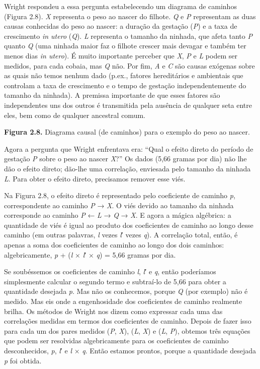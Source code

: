 \documentclass[11pt,a5paper,twoside]{book}
\begin{document}
Wright respondeu a essa pergunta estabelecendo um diagrama de caminhos (Figura 2.8). \textit{X} representa o peso ao nascer do filhote. \textit{Q} e \textit{P} representam as duas causas conhecidas do peso ao nascer: a duração da gestação (\textit{P}) e a taxa de crescimento \textit{in utero} (\textit{Q}). \textit{L} representa o tamanho da ninhada, que afeta tanto \textit{P} quanto \textit{Q} (uma ninhada maior faz o filhote crescer mais devagar e também ter menos dias \textit{in utero}). É muito importante perceber que \textit{X}, \textit{P} e \textit{L} podem ser medidos, para cada cobaia, mas \textit{Q} não. Por fim, \textit{A} e \textit{C} são causas exógenas sobre as quais não temos nenhum dado (p.ex., fatores hereditários e ambientais que controlam a taxa de crescimento e o tempo de gestação independentemente do tamanho da ninhada). A premissa importante de que esses fatores são independentes uns dos outros é transmitida pela ausência de qualquer seta entre eles, bem como de qualquer ancestral comum.

\textbf{Figura 2.8.} Diagrama causal (de caminhos) para o exemplo do peso ao nascer.

Agora a pergunta que Wright enfrentava era: “Qual o efeito direto do período de gestação \textit{P} sobre o peso ao nascer \textit{X}?” Os dados (5,66 gramas por dia) não lhe dão o efeito direto; dão-lhe uma correlação, enviesada pelo tamanho da ninhada \textit{L}. Para obter o efeito direto, precisamos remover esse viés.

Na Figura 2.8, o efeito direto é representado pelo coeficiente de caminho \textit{p}, correspondente ao caminho \textit{P} → \textit{X}. O viés devido ao tamanho da ninhada corresponde ao caminho \textit{P} ← \textit{L} → \textit{Q} → \textit{X}. E agora a mágica algébrica: a quantidade de viés é igual ao produto dos coeficientes de caminho ao longo desse caminho (em outras palavras, \textit{l} vezes \textit{l}′ vezes \textit{q}). A correlação total, então, é apenas a soma dos coeficientes de caminho ao longo dos dois caminhos: algebricamente, \textit{p} + (\textit{l} × \textit{l}′ × \textit{q}) = 5,66 gramas por dia.

Se soubéssemos os coeficientes de caminho \textit{l}, \textit{l}′ e \textit{q}, então poderíamos simplesmente calcular o segundo termo e subtraí-lo de 5,66 para obter a quantidade desejada \textit{p}. Mas não os conhecemos, porque \textit{Q} (por exemplo) não é medido. Mas eis onde a engenhosidade dos coeficientes de caminho realmente brilha. Os métodos de Wright nos dizem como expressar cada uma das correlações medidas em termos dos coeficientes de caminho. Depois de fazer isso para cada um dos pares medidos (\textit{P}, \textit{X}), (\textit{L}, \textit{X}) e (\textit{L}, \textit{P}), obtemos três equações que podem ser resolvidas algebricamente para os coeficientes de caminho desconhecidos, \textit{p}, \textit{l}′ e \textit{l} × \textit{q}. Então estamos prontos, porque a quantidade desejada \textit{p} foi obtida.
\end{document}
